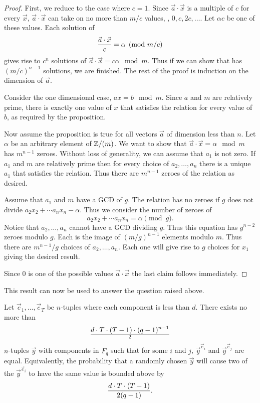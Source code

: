 \begin{proof}
First, we reduce to the case where $c = 1$.  Since $\vec a \cdot \vec x$ is
a multiple of $c$ for every $\vec x$, $\vec a \cdot \vec x$ can take on no more
than $m/c$ values, \ie, $0, c, 2c, \ldots$.  Let $\alpha c$ be one of these
values.  Each solution of 
\begin{equation}
{\vec a \cdot \vec x \over c} = \alpha \pmod{m/c} 
\label{Eq:c}
\end{equation}
gives rise to $c^n$ solutions of $\vec{a} \cdot \vec{x} = c \alpha
\mod{m}$.  Thus if we can show that  has $(m/c)^{n-1}$
solutions, we are finished.  The rest of the proof is induction on the 
dimension of $\vec{a}$.

Consider the one dimensional case, $a x = b \mod{m}$.  Since $a$
and $m$ are relatively prime, there is exactly one value of $x$ that
satisfies the relation for every value of $b$, as required by the
proposition.

Now assume the proposition is true for all vectors $\vec a$ of
dimension less than $n$.  Let $\alpha$ be an arbitrary element of
$\mathbb{Z}/(m)$.  We want to show that $\vec a \cdot \vec x = \alpha
\mod{m}$ has $m^{n-1}$ zeroes.  Without loss of generality, we can
assume that $a_1$ is not zero.  If $a_1$ and $m$ are relatively prime
then for every choice of $a_2, \ldots, a_n$ there is a unique $a_1$
that satisfies the relation.  Thus there are $m^{n-1}$ zeroes of the
relation as desired.

Assume that $a_1$ and $m$ have a GCD of $g$.  The relation has no
zeroes if $g$ does not divide $a_2 x_2 + \cdots a_n x_n - \alpha$.
Thus we consider the number of zeroes of
\[
a_2 x_2 + \cdots a_n x_n = \alpha \pmod{g}.
\]
Notice that $a_2, \ldots, a_n$ cannot have a GCD dividing $g$.  Thus
this equation has $g^{n-2}$ zeroes modulo $g$.  Each is the image of
$(m/g)^{n-1}$ elements modulo $m$.  Thus there are $m^{n-1}/g$ choices
of $a_2, \ldots, a_n$.  Each one will give rise to $g$ choices for
$x_1$ giving the desired result.

Since $0$ is one of the possible values $\vec{a} \cdot \vec{x}$ the
last claim follows immediately.
\end{proof}

This result can now be used to answer the question raised above.

\begin{proposition} \label{Vandermonde:Vec:Indep:Prop}
Let $\vec{e}_1, \ldots, \vec{e}_T$ be $n$-tuples where each component is less
than $d$.  There exists no more than
\[
d \cdot T \cdot (T-1) \cdot (q-1)^{n-1} \over 2
\]
$n$-tuples $\vec{y}$ with components in $F_q$ such that for some $i$
and $j$, $\vec{y}^{\vec{e}_i}$ and $\vec{y}^{\vec{e}_j}$ are equal.
Equivalently, the probability that a randomly chosen $\vec{y}$ will
cause two of the $\vec{y}^{\vec{e}_i}$ to have the same value is
bounded above by
\[
{d \cdot T \cdot (T-1) \over 2 (q - 1)}.
\]  
\end{proposition}

